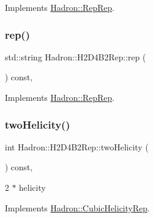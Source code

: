Implements \mbox{\hyperlink{structHadron_1_1RepRep_ab3213025f6de249f7095892109575fde}{Hadron\+::\+Rep\+Rep}}.

\mbox{\label{structHadron_1_1H2D4B2Rep_a8d556a242b6426bf15612422a8e22ce6}} 
\subsubsection{\texorpdfstring{rep()}{rep()}\hspace{0.1cm}{\footnotesize\ttfamily [5/5]}}
{\footnotesize\ttfamily std\+::string Hadron\+::\+H2\+D4\+B2\+Rep\+::rep (\begin{DoxyParamCaption}{ }\end{DoxyParamCaption}) const\hspace{0.3cm}{\ttfamily [inline]}, {\ttfamily [virtual]}}



Implements \mbox{\hyperlink{structHadron_1_1RepRep_ab3213025f6de249f7095892109575fde}{Hadron\+::\+Rep\+Rep}}.

\mbox{\label{structHadron_1_1H2D4B2Rep_a21f6e9059862c9e6f8b6d5cbb10d8b80}} 
\subsubsection{\texorpdfstring{twoHelicity()}{twoHelicity()}\hspace{0.1cm}{\footnotesize\ttfamily [1/3]}}
{\footnotesize\ttfamily int Hadron\+::\+H2\+D4\+B2\+Rep\+::two\+Helicity (\begin{DoxyParamCaption}{ }\end{DoxyParamCaption}) const\hspace{0.3cm}{\ttfamily [inline]}, {\ttfamily [virtual]}}

2 $\ast$ helicity 

Implements \mbox{\hyperlink{structHadron_1_1CubicHelicityRep_af507aa56fc2747eacc8cb6c96db31ecc}{Hadron\+::\+Cubic\+Helicity\+Rep}}.

\mbox{\label{structHadron_1_1H2D4B2Rep_a21f6e9059862c9e6f8b6d5cbb10d8b80}} 
